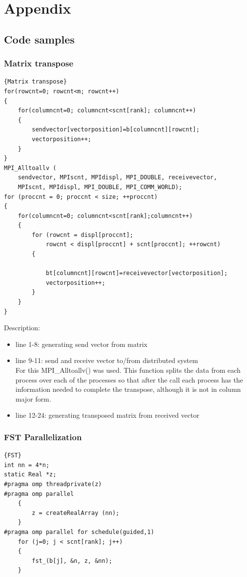 \documentclass{article}
\begin{document}
\section{Appendix}
\subsection{Code samples}
\subsubsection{Matrix transpose\label{matrixtranspose}}
\begin{lstlisting}[caption=Matrix transposition using MPI]{Matrix transpose}
for(rowcnt=0; rowcnt<m; rowcnt++)
{
    for(columncnt=0; columncnt<scnt[rank]; columncnt++)
    {
        sendvector[vectorposition]=b[columncnt][rowcnt];
        vectorposition++;
    }
}
MPI_Alltoallv (
    sendvector, MPIscnt, MPIdispl, MPI_DOUBLE, receivevector,
    MPIscnt, MPIdispl, MPI_DOUBLE, MPI_COMM_WORLD);
for (proccnt = 0; proccnt < size; ++proccnt)
{
    for(columncnt=0; columncnt<scnt[rank];columncnt++)
    {
        for (rowcnt = displ[proccnt]; 
        	rowcnt < displ[proccnt] + scnt[proccnt]; ++rowcnt)
        {

            bt[columncnt][rowcnt]=receivevector[vectorposition];
            vectorposition++;
        }
    }
}
\end{lstlisting}
Description:
\begin{itemize}
\item line 1-8: generating send vector from matrix
\item line 9-11: send and receive vector to/from distributed system\\
For this MPI\_Alltoallv() was used. This function splits the data from each process over each of the processes so that after the call each process has the information needed to complete the transpose, although it is not in column major form.
\item line 12-24: generating transposed matrix from received vector
\end{itemize}

\subsubsection{FST Parallelization \label{sub:fst}}
\begin{lstlisting}[caption=Parallelizing the FST function]{FST}
int nn = 4*n;
static Real *z;
#pragma omp threadprivate(z)
#pragma omp parallel
    {
        z = createRealArray (nn);
    }
#pragma omp parallel for schedule(guided,1)
    for (j=0; j < scnt[rank]; j++)
    {
        fst_(b[j], &n, z, &nn);
    }
\end{lstlisting}
\end{document}
